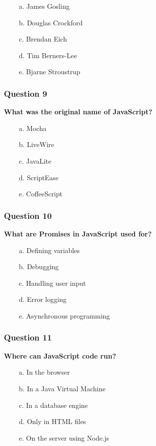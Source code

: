 \documentclass{article}
\newcommand{\cmark}{\textcolor{green}{\ding{51}}} %
\newcommand{\xmark}{\textcolor{red}{\ding{55}}}   %
\begin{document}
\begin{itemize}
  \item[\xmark\ a.] James Gosling
  \item[\xmark\ b.] Douglas Crockford
  \item[\cmark\ c.] Brendan Eich
  \item[\xmark\ d.] Tim Berners-Lee
  \item[\xmark\ e.] Bjarne Stroustrup
\end{itemize}

\subsubsection*{Question 9}
\textbf{What was the original name of JavaScript?}

\begin{itemize}
  \item[\cmark\ a.] Mocha
  \item[\xmark\ b.] LiveWire
  \item[\xmark\ c.] JavaLite
  \item[\xmark\ d.] ScriptEase
  \item[\xmark\ e.] CoffeeScript
\end{itemize}

\subsubsection*{Question 10}
\textbf{What are Promises in JavaScript used for?}

\begin{itemize}
  \item[\xmark\ a.] Defining variables
  \item[\xmark\ b.] Debugging
  \item[\xmark\ c.] Handling user input
  \item[\xmark\ d.] Error logging
  \item[\cmark\ e.] Asynchronous programming
\end{itemize}

\subsubsection*{Question 11}
\textbf{Where can JavaScript code run?}

\begin{itemize}
  \item[\cmark\ a.] In the browser
  \item[\xmark\ b.] In a Java Virtual Machine
  \item[\xmark\ c.] In a database engine
  \item[\xmark\ d.] Only in HTML files
  \item[\cmark\ e.] On the server using Node.js
\end{itemize}
\end{document}
